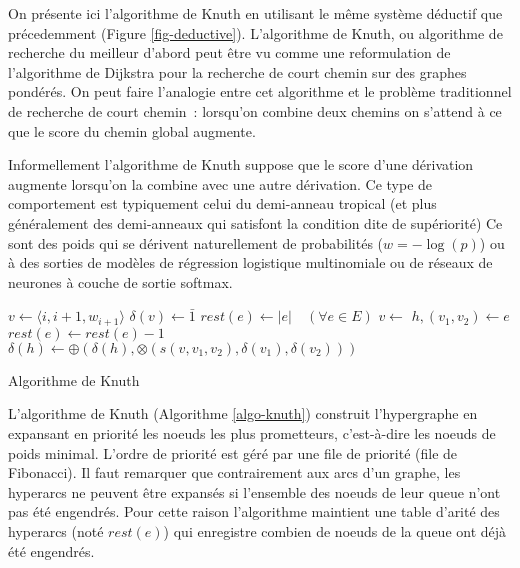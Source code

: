 \documentclass[11pt,openany]{book}
\begin{document}
On présente ici l'algorithme de Knuth en utilisant le même système déductif que précedemment (Figure \ref{fig-deductive}).
L'algorithme de Knuth, ou algorithme de recherche du meilleur d'abord peut être vu comme
 une reformulation de l'algorithme de Dijkstra pour la recherche de court chemin sur des graphes pondérés.
On peut faire l'analogie entre cet algorithme et le problème traditionnel de recherche de court chemin~:
lorsqu'on combine deux chemins on s'attend à ce que le score du chemin global augmente.

Informellement l'algorithme de Knuth suppose que le score d'une dérivation augmente lorsqu'on la combine avec une autre dérivation.
Ce type de comportement est typiquement celui du demi-anneau tropical (et plus généralement des demi-anneaux qui satisfont 
la condition dite de supériorité)
Ce sont des poids qui se dérivent naturellement de probabilités 
($w = -\log(p)$) ou à des sorties de modèles de régression logistique multinomiale ou de réseaux de neurones
à couche de sortie softmax.

\begin{algorithm}
\begin{algorithmic}[htbp]
\State $v \gets \langle i,i+1,w_{i+1} \rangle$
\State $\delta(v) \gets \bar{1}$
\State  {}
\EndFor
\State   $rest(e) \gets |e| \quad (\forall e \in E)$ 
\State $v \gets $ 
\State $h, (v_1, v_2) \gets e$
\State $rest(e) \gets rest(e) - 1$
\State $\delta(h) \gets \oplus( \delta(h),  \otimes(s(v,v_1,v_2),\delta(v_1),\delta(v_2)))$
\State {}
\EndIf
\EndFor
\EndWhile
\EndFunction
\end{algorithmic}
\caption{\label{algo-knuth} Algorithme de Knuth}
\end{algorithm}




L'algorithme de Knuth (Algorithme \ref{algo-knuth}) construit l'hypergraphe en expansant en priorité 
les noeuds les plus prometteurs, c'est-à-dire les noeuds de poids minimal.
L'ordre de priorité est géré par une file de priorité (file de Fibonacci).
Il faut remarquer que contrairement aux arcs d'un graphe, les hyperarcs ne peuvent être expansés 
si l'ensemble des noeuds de leur queue n'ont pas été engendrés. Pour cette raison l'algorithme maintient une table d'arité des hyperarcs
(noté $rest(e)$) qui enregistre combien de noeuds de la queue ont déjà été engendrés.
\end{document}

